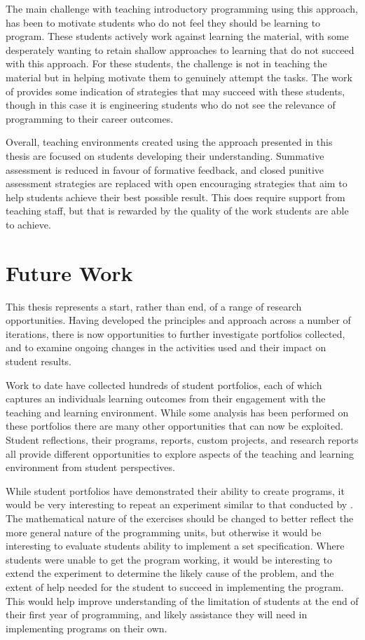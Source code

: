 The main challenge with teaching introductory programming using this approach, has been to motivate students who do not feel they should be learning to program. These students actively work against learning the material, with some desperately wanting to retain shallow approaches to learning that do not succeed with this approach. For these students, the challenge is not in teaching the material but in helping motivate them to genuinely attempt the tasks. The work of \citet{Guzdial:2005} provides some indication of strategies that may succeed with these students, though in this case it is engineering students who do not see the relevance of programming to their career outcomes. 

Overall, teaching environments created using the approach presented in this thesis are focused on students developing their understanding. Summative assessment is reduced in favour of formative feedback, and closed punitive assessment strategies are replaced with open encouraging strategies that aim to help students achieve their best possible result. This does require support from teaching staff, but that is rewarded by the quality of the work students are able to achieve. 


\section{Future Work} %
\label{sec:future_work}

This thesis represents a start, rather than end, of a range of research opportunities. Having developed the principles and approach across a number of iterations, there is now opportunities to further investigate portfolios collected, and to examine ongoing changes in the activities used and their impact on student results.

Work to date have collected hundreds of student portfolios, each of which captures an individuals learning outcomes from their engagement with the teaching and learning environment. While some analysis has been performed on these portfolios there are many other opportunities that can now be exploited. Student reflections, their programs, reports, custom projects, and research reports all provide different opportunities to explore aspects of the teaching and learning environment from student perspectives.

While student portfolios have demonstrated their ability to create programs, it would be very interesting to repeat an experiment similar to that conducted by \citet{McCracken:2001}. The mathematical nature of the exercises should be changed to better reflect the more general nature of the programming units, but otherwise it would be interesting to evaluate students ability to implement a set specification. Where students were unable to get the program working, it would be interesting to extend the experiment to determine the likely cause of the problem, and the extent of help needed for the student to succeed in implementing the program. This would help improve understanding of the limitation of students at the end of their first year of programming, and likely assistance they will need in implementing programs on their own. 

